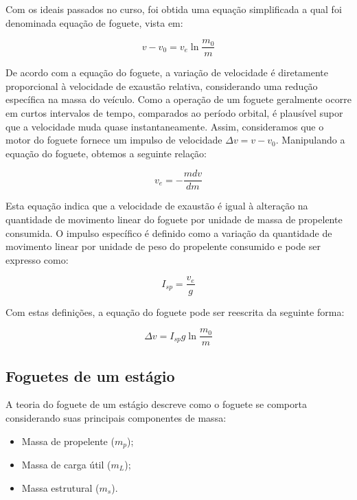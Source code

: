 \par Com os ideais passados no curso, foi obtida uma equação simplificada a qual foi denominada equação de foguete, vista em:

\begin{equation}
v-v_0=v_e \ln \frac{m_0}{m}
\label{eq:foguete}
\end{equation}

\par De acordo com a equação do foguete, a variação de velocidade é diretamente proporcional à velocidade de exaustão relativa, considerando uma redução específica na massa do veículo. Como a operação de um foguete geralmente ocorre em curtos intervalos de tempo, comparados ao período orbital, é plausível supor que a velocidade muda quase instantaneamente. Assim, consideramos que o motor do foguete fornece um impulso de velocidade $\Delta v = v - v_0$. Manipulando a equação do foguete, obtemos a seguinte relação:

\begin{equation}
v_e = -\frac{mdv}{dm}
\end{equation}

\par Esta equação indica que a velocidade de exaustão é igual à alteração na quantidade de movimento linear do foguete por unidade de massa de propelente consumida. O impulso específico é definido como a variação da quantidade de movimento linear por unidade de peso do propelente consumido e pode ser expresso como:

\begin{equation}
I_{sp} = \frac{v_e}{g}
\end{equation}

Com estas definições, a equação do foguete pode ser reescrita da seguinte forma:

\begin{equation}
\Delta v = I_{sp} g \ln \frac{m_0}{m}
\label{eq:foguetefinal}
\end{equation}

\subsection{Foguetes de um estágio}

\par A teoria do foguete de um estágio descreve como o foguete se comporta considerando suas principais componentes de massa: 

\begin{itemize}
    \item Massa de propelente ($m_p$);
    \item Massa de carga útil ($m_L$);
    \item Massa estrutural ($m_s$). 
\end{itemize}

